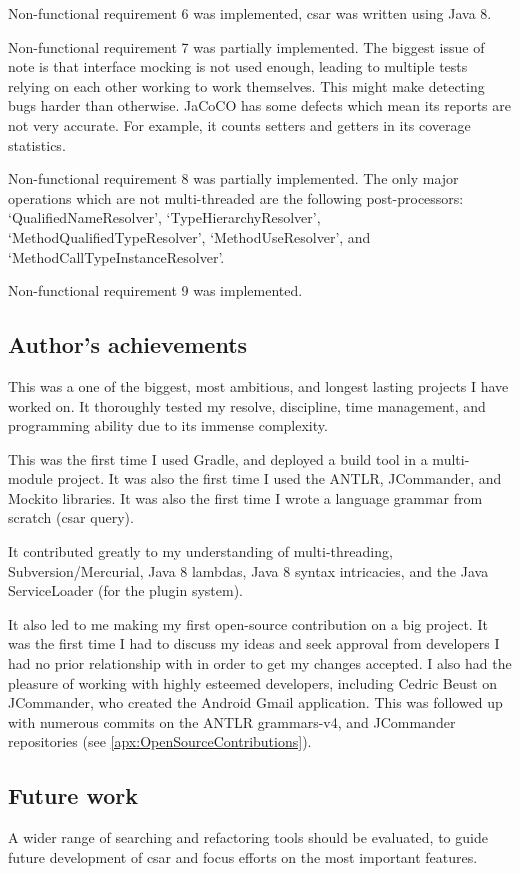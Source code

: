 \documentclass[12pt, letterpaper]{article}
\begin{document}
Non-functional requirement 6 was implemented, csar was written using Java 8.

Non-functional requirement 7 was partially implemented.
The biggest issue of note is that interface mocking is not used enough, leading to multiple tests relying on each other working to work themselves.
This might make detecting bugs harder than otherwise.
JaCoCO has some defects which mean its reports are not very accurate.
For example, it counts setters and getters in its coverage statistics.

Non-functional requirement 8 was partially implemented.
The only major operations which are not multi-threaded are the following post-processors: `QualifiedNameResolver', `TypeHierarchyResolver', `MethodQualifiedTypeResolver', `MethodUseResolver', and `MethodCallTypeInstanceResolver'.

Non-functional requirement 9 was implemented.

\subsection{Author's achievements}
This was a one of the biggest, most ambitious, and longest lasting projects I have worked on.
It thoroughly tested my resolve, discipline, time management, and programming ability due to its immense complexity.

This was the first time I used Gradle, and deployed a build tool in a multi-module project.
It was also the first time I used the ANTLR, JCommander, and Mockito libraries.
It was also the first time I wrote a language grammar from scratch (csar query).

It contributed greatly to my understanding of multi-threading, Subversion/Mercurial, Java 8 lambdas, Java 8 syntax intricacies, and the Java ServiceLoader (for the plugin system).

It also led to me making my first open-source contribution on a big project.
It was the first time I had to discuss my ideas and seek approval from developers I had no prior relationship with in order to get my changes accepted.
I also had the pleasure of working with highly esteemed developers, including Cedric Beust on JCommander, who created the Android Gmail application.
This was followed up with numerous commits on the ANTLR grammars-v4, and JCommander repositories (see \ref{apx:OpenSourceContributions}).

\subsection{Future work}
A wider range of searching and refactoring tools should be evaluated, to guide future development of csar and focus efforts on the most important features.
\end{document}
